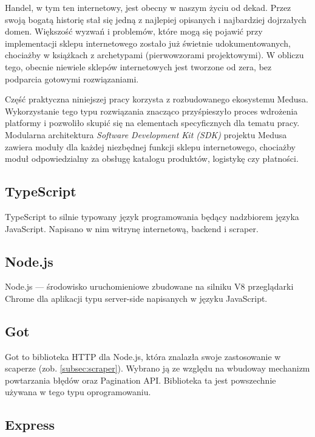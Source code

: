 Handel, w tym ten internetowy, jest obecny w naszym życiu od dekad.
Przez swoją bogatą historię stał się jedną z najlepiej opisanych i najbardziej dojrzałych domen.
Większość wyzwań i problemów, które mogą się pojawić przy implementacji sklepu internetowego zostało już świetnie udokumentowanych, chociażby w książkach z archetypami (pierwowzorami projektowymi).
W obliczu tego, obecnie niewiele sklepów internetowych jest tworzone od zera, bez podparcia gotowymi rozwiązaniami.

Część praktyczna niniejszej pracy korzysta z rozbudowanego ekosystemu Medusa\cite{medusajs-home}.
Wykorzystanie tego typu rozwiązania znacząco przyśpieszyło proces wdrożenia platformy i pozwoliło skupić się na elementach specyficznych dla tematu pracy.
Modularna architektura \emph{Software Development Kit (SDK)} projektu Medusa zawiera moduły dla każdej niezbędnej funkcji sklepu internetowego, chociażby moduł odpowiedzialny za obsługę katalogu produktów, logistykę czy płatności.

\subsection{TypeScript}\label{subsec:typescript}

TypeScript to silnie typowany język programowania będący nadzbiorem języka JavaScript.
Napisano w nim witrynę internetową, backend i scraper.

\subsection{Node.js}\label{subsec:nodejs}

Node.js --- środowisko uruchomieniowe zbudowane na silniku V8 przeglądarki Chrome dla aplikacji typu server-side napisanych w języku JavaScript.

\subsection{Got}\label{subsec:got}

Got to biblioteka HTTP dla Node.js, która znalazła swoje zastosowanie w scaperze (zob. \autoref{subsec:scraper}).
Wybrano ją ze względu na wbudoway mechanizm powtarzania błędów oraz Pagination API\@.
Biblioteka ta jest powszechnie używana w tego typu oprogramowaniu.

\subsection{Express}\label{subsec:express}

